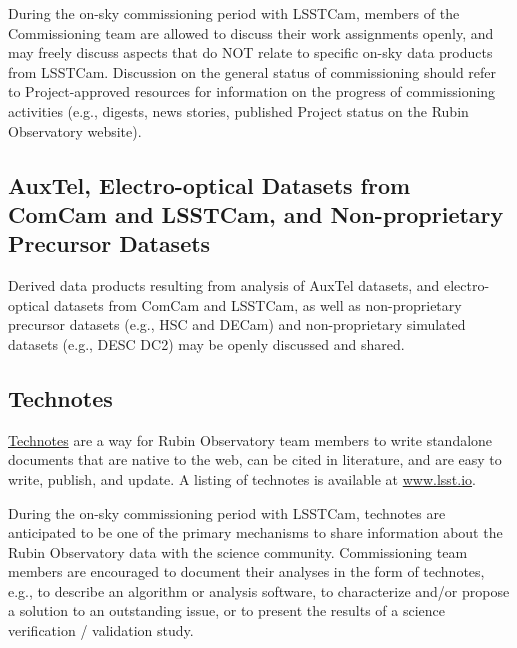 \documentclass[SE,authoryear,toc,lsstdraft]{lsstdoc}
\begin{document}
During the on-sky commissioning period with LSSTCam, members of the Commissioning team are allowed to discuss their work assignments openly, and may freely discuss aspects that do NOT relate to specific on-sky data products from LSSTCam.
Discussion on the general status of commissioning should refer to Project-approved resources for information on the progress of commissioning activities (e.g., digests, news stories, published Project status on the Rubin Observatory website).

\subsection{AuxTel, Electro-optical Datasets from ComCam and LSSTCam, and Non-proprietary Precursor Datasets}

Derived data products resulting from analysis of AuxTel datasets, and electro-optical datasets from ComCam and LSSTCam, as well as non-proprietary precursor datasets (e.g., HSC and DECam) and non-proprietary simulated datasets (e.g., DESC DC2) may be openly discussed and shared.



\subsection{Technotes}

\href{https://developer.lsst.io/project-docs/technotes.html}{Technotes} are a way for Rubin Observatory team members to write standalone documents that are native to the web, can be cited in literature, and are easy to write, publish, and update.
A listing of technotes is available at \url{www.lsst.io}.

During the on-sky commissioning period with LSSTCam, technotes are anticipated to be one of the primary mechanisms to share information about the Rubin Observatory data with the science community.
Commissioning team members are encouraged to document their analyses in the form of technotes, e.g., to describe an algorithm or analysis software, to characterize and/or propose a solution to an outstanding issue, or to present the results of a science verification / validation study.
\end{document}
